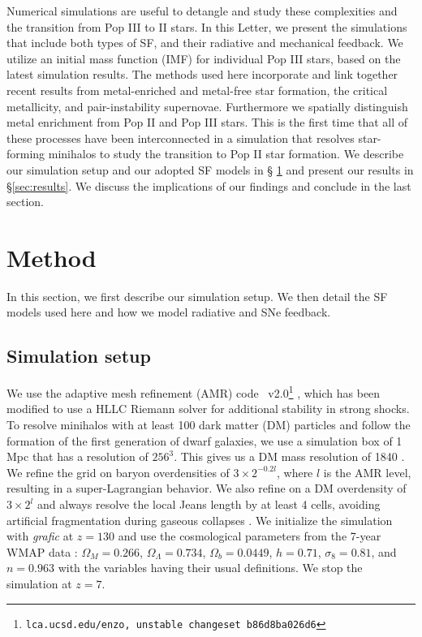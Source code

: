 \documentclass[apjl]{emulateapj}
\begin{document}
Numerical simulations are useful to detangle and study these
complexities and the transition from Pop III to II stars.  In this
Letter, we present the simulations that include both types of SF, and
their radiative and mechanical feedback.  We utilize an initial mass
function (IMF) for individual Pop III stars, based on the latest
simulation results.  The methods used here incorporate and link
together recent results from metal-enriched and metal-free star
formation, the critical metallicity, and pair-instability supernovae.
Furthermore we spatially distinguish metal enrichment from Pop II and
Pop III stars.  This is the first time that all of these processes
have been interconnected in a simulation that resolves star-forming
minihalos to study the transition to Pop II star formation.  We
describe our simulation setup and our adopted SF models in \S
\ref{sec:setup} and present our results in \S \ref{sec:results}.  We
discuss the implications of our findings and conclude in the last
section.

\section{Method}
\label{sec:setup}

In this section, we first describe our simulation setup.  We then
detail the SF models used here and how we model radiative and SNe
feedback.

\subsection{Simulation setup}

We use the adaptive mesh refinement (AMR) code
\enzo~v2.0\footnote[\dag]{\texttt{lca.ucsd.edu/enzo, unstable
    changeset b86d8ba026d6}} \citep{BryanNorman1997, OShea2004}, which
has been modified to use a HLLC Riemann solver \citep{Toro94_HLLC} for
additional stability in strong shocks.  To resolve minihalos with at
least 100 dark matter (DM) particles and follow the formation of the
first generation of dwarf galaxies, we use a simulation box of 1 Mpc
that has a resolution of $256^3$.  This gives us a DM mass resolution
of 1840 \Ms.  We refine the grid on baryon overdensities of $3 \times
2^{-0.2l}$, where $l$ is the AMR level, resulting in a
super-Lagrangian behavior.  We also refine on a DM overdensity of $3
\times 2^l$ and always resolve the local Jeans length by at least 4
cells, avoiding artificial fragmentation during gaseous collapses
\citep{Truelove97}.  We initialize the simulation with \textsl{grafic}
\citep{Bertschinger01} at $z = 130$ and use the cosmological
parameters from the 7-year WMAP data \citep{WMAP7}: $\Omega_M =
0.266$, $\Omega_\Lambda = 0.734$, $\Omega_b = 0.0449$, $h = 0.71$,
$\sigma_8 = 0.81$, and $n = 0.963$ with the variables having their
usual definitions.  We stop the simulation at $z=7$.
\end{document}
